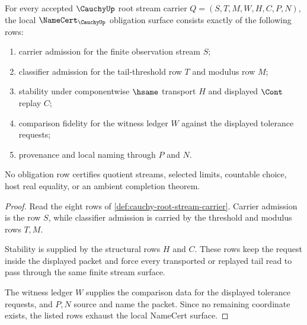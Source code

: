\begin{theorem}
\label{thm:cauchy-root-namecert-obligation-surface}
For every accepted $\CauchyUp$ root stream carrier $Q=(S,T,M,W,H,C,P,N)$, the local $\NameCert_{\CauchyUp}$ obligation surface consists exactly of the following rows:
\begin{enumerate}
\item carrier admission for the finite observation stream $S$;
\item classifier admission for the tail-threshold row $T$ and modulus row $M$;
\item stability under componentwise $\hsame$ transport $H$ and displayed $\Cont$ replay $C$;
\item comparison fidelity for the witness ledger $W$ against the displayed tolerance requests;
\item provenance and local naming through $P$ and $N$.
\end{enumerate}
No obligation row certifies quotient streams, selected limits, countable choice, host real equality, or an ambient completion theorem.
\end{theorem}
\begin{proof}
Read the eight rows of \autoref{def:cauchy-root-stream-carrier}. Carrier admission is the row $S$, while classifier admission is carried by the threshold and modulus rows $T,M$.

Stability is supplied by the structural rows $H$ and $C$. These rows keep the request inside the displayed packet and force every transported or replayed tail read to pass through the same finite stream surface.

The witness ledger $W$ supplies the comparison data for the displayed tolerance requests, and $P,N$ source and name the packet. Since no remaining coordinate exists, the listed rows exhaust the local NameCert surface.
\end{proof}

